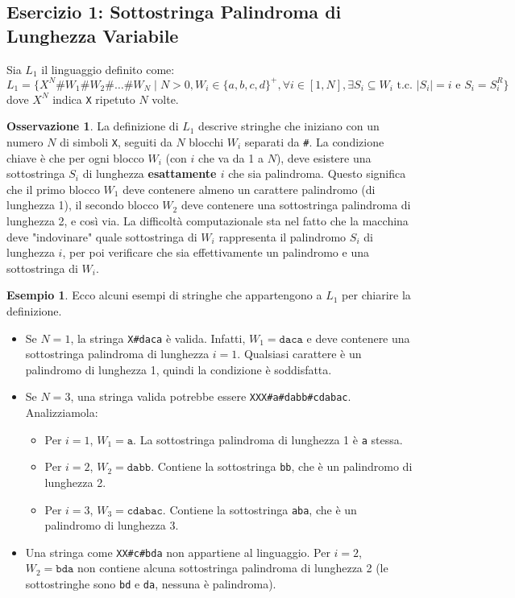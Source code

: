 \documentclass[a4paper]{article}
\theoremstyle{definition} %
\newtheorem{example}{Esempio}
\newtheorem{remark}{Osservazione}
\newcommand{\Sh}{\texttt{\#}} %
\begin{document}
\subsection{Esercizio 1: Sottostringa Palindroma di Lunghezza Variabile}

Sia $L_1$ il linguaggio definito come:
\[
L_1 = \{ X^N \Sh W_1 \Sh W_2 \Sh \dots \Sh W_N \mid N > 0, W_i \in \{a,b,c,d\}^+, \forall i \in [1, N], \exists S_i \subseteq W_i \text{ t.c. } |S_i| = i \text{ e } S_i = S_i^R \}
\]
dove $X^N$ indica \texttt{X} ripetuto $N$ volte.

\begin{remark}
La definizione di $L_1$ descrive stringhe che iniziano con un numero $N$ di simboli \texttt{X}, seguiti da $N$ blocchi $W_i$ separati da \texttt{\#}. La condizione chiave è che per ogni blocco $W_i$ (con $i$ che va da 1 a $N$), deve esistere una sottostringa $S_i$ di lunghezza \textbf{esattamente $i$} che sia palindroma. Questo significa che il primo blocco $W_1$ deve contenere almeno un carattere palindromo (di lunghezza 1), il secondo blocco $W_2$ deve contenere una sottostringa palindroma di lunghezza 2, e così via. La difficoltà computazionale sta nel fatto che la macchina deve "indovinare" quale sottostringa di $W_i$ rappresenta il palindromo $S_i$ di lunghezza $i$, per poi verificare che sia effettivamente un palindromo e una sottostringa di $W_i$.
\end{remark}

\begin{example}
Ecco alcuni esempi di stringhe che appartengono a $L_1$ per chiarire la definizione.
\begin{itemize}
    \item Se $N=1$, la stringa \texttt{X\#daca} è valida. Infatti, $W_1 = \texttt{daca}$ e deve contenere una sottostringa palindroma di lunghezza $i=1$. Qualsiasi carattere è un palindromo di lunghezza 1, quindi la condizione è soddisfatta.
    \item Se $N=3$, una stringa valida potrebbe essere \texttt{XXX\#a\#dabb\#cdabac}. Analizziamola:
    \begin{itemize}
        \item Per $i=1$, $W_1 = \texttt{a}$. La sottostringa palindroma di lunghezza 1 è \texttt{a} stessa.
        \item Per $i=2$, $W_2 = \texttt{dabb}$. Contiene la sottostringa \texttt{bb}, che è un palindromo di lunghezza 2.
        \item Per $i=3$, $W_3 = \texttt{cdabac}$. Contiene la sottostringa \texttt{aba}, che è un palindromo di lunghezza 3.
    \end{itemize}
    \item Una stringa come \texttt{XX\#c\#bda} non appartiene al linguaggio. Per $i=2$, $W_2 = \texttt{bda}$ non contiene alcuna sottostringa palindroma di lunghezza 2 (le sottostringhe sono \texttt{bd} e \texttt{da}, nessuna è palindroma).
\end{itemize}
\end{example}
\end{document}
